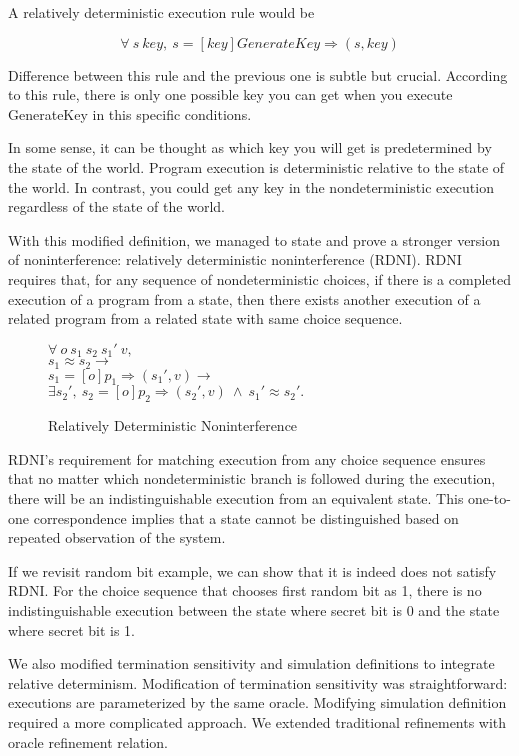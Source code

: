 A relatively deterministic execution rule would be

$$\forall\ s\ key,\ s  =[key]GenerateKey\Rightarrow (s, key)$$ 

Difference between this rule and the previous one is subtle but crucial. 
According to this rule, there is only one possible key you can get when you execute GenerateKey in this specific conditions.

In some sense, it can be thought as which key you will get is predetermined by the state of the world. Program execution is deterministic relative to the state of the world.
In contrast, you could get any key in the nondeterministic execution regardless of the state of the world.

With this modified definition, we managed to state and prove a stronger version of noninterference: relatively deterministic noninterference (RDNI). RDNI requires that, for any sequence of nondeterministic choices, if there is a completed execution of a program from a state, then there exists another execution of a related program from a related state with same choice sequence.

\begin{figure}[H]
	$\forall\ o\ s_1\ s_2\ s_1'\ v,$\\
	$s_1\approx s_2 \rightarrow$\\
	$s_1 =[o]p_1\Rightarrow (s_1', v) \rightarrow$\\
	$\exists s_2',\ s_2 =[o]p_2\Rightarrow (s_2', v)\ \wedge\ s_1'\approx s_2'.$\\
	\caption{Relatively Deterministic Noninterference}
\end{figure}

RDNI's requirement for matching execution from any choice sequence ensures that no matter which nondeterministic branch is followed during the execution, there will be an indistinguishable execution from an equivalent state. This one-to-one correspondence implies that a state cannot be distinguished based on repeated observation of the system.

If we revisit random bit example, we can show that it is indeed does not satisfy RDNI. For the choice sequence that chooses first random bit as 1, there is no indistinguishable execution between the state where secret bit is 0 and the state where secret bit is 1.

We also modified termination sensitivity and simulation definitions to integrate relative determinism. Modification of termination sensitivity was straightforward: executions are parameterized by the same oracle. Modifying simulation definition required a more complicated approach. We extended traditional refinements with oracle refinement relation.

